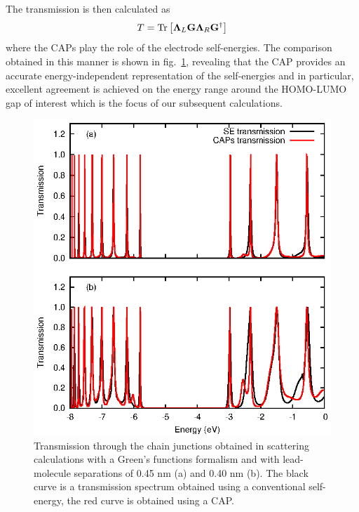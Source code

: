 The transmission is then calculated as
\begin{equation}
  T = \mathop{\mathrm{Tr}}\nolimits \left[ \mathbf{\Lambda}_L \mathbf{G} \mathbf{\Lambda}_R \mathbf{G}^\dagger \right]
  \label{eq:transmfromG}
\end{equation}
where the \acp{CAP} play the role of the electrode self-energies.
The comparison obtained in this manner is shown in fig.~\ref{fig:transdat},
revealing that the \ac{CAP} provides an accurate energy-independent
representation of the self-energies and in particular, excellent agreement
is achieved on the energy range around the \ac{HOMO}-\ac{LUMO} gap of
interest which is the focus of our subsequent calculations.

\begin{figure} 
	\begin{center}
		\includegraphics[width=0.9\linewidth]{figures/figure2a_2b}
	\end{center}
	\caption{Transmission through the chain junctions obtained in
	         scattering calculations with a Green's functions formalism
		 and with lead-molecule separations of 0.45 nm (a) and 0.40
		 nm (b). The black curve is a transmission spectrum obtained
		 using a conventional self-energy, the red curve is
		 obtained using a \ac{CAP}.}
	\label{fig:transdat}
\end{figure}

